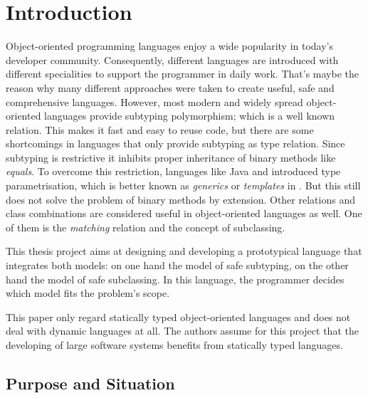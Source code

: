 \chapter{Introduction}
Object-oriented programming languages enjoy a wide popularity in today's
developer community. Consequently, different languages are introduced with different
specialities to support the programmer in daily work. That's maybe
the reason why many different approaches were taken to create useful, safe
and comprehensive languages. However, most modern and widely spread
object-oriented languages provide subtyping polymorphism; which is a well
known relation. This makes
it fast and easy to reuse code, but there are some shortcomings in languages
that only provide subtyping as type relation. Since subtyping
is restrictive it inhibits proper inheritance of binary methods like
\emph{equals}. To overcome this restriction, languages like Java and \cs
introduced type parametrisation, which is better known as \emph{generics}
or \emph{templates} in \cpp. But this still does not solve the problem
of binary methods by extension. Other relations and class combinations
are considered useful in object-oriented languages as well. One of them
is the \emph{matching} relation and the concept of subclassing.

This thesis project aims at designing and developing a prototypical
language that integrates both models: on one hand the model of safe
subtyping, on the other hand the model of safe subclassing. In this language,
the programmer decides which model fits the problem's scope.

This paper only regard statically typed object-oriented languages and does
not deal with dynamic languages at all. The authors assume for this project
that the developing of large software systems benefits from statically
typed languages.

\section{Purpose and Situation}
